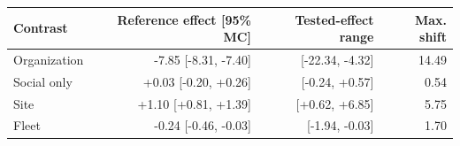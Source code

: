 \begin{tabular}{lrrr}
\toprule
Contrast & Reference effect [95\% MC] & Tested-effect range & Max. shift \\
\midrule
Organization & -7.85 [-8.31, -7.40] & [-22.34, -4.32] & 14.49 \\
Social only & +0.03 [-0.20, +0.26] & [-0.24, +0.57] & 0.54 \\
Site & +1.10 [+0.81, +1.39] & [+0.62, +6.85] & 5.75 \\
Fleet & -0.24 [-0.46, -0.03] & [-1.94, -0.03] & 1.70 \\
\bottomrule
\end{tabular}
